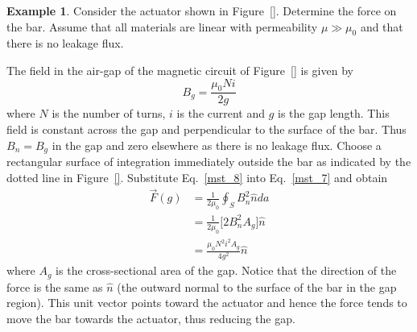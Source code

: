 \documentclass[11pt,a4paper,oneside]{book}
\numberwithin{equation}{section}
\theoremstyle{it}
\theoremstyle{definition}
\newtheorem{example}{Example}[section]
\begin{document}
\begin{example}
Consider the actuator shown in Figure~\ref{}. Determine the force on the bar. Assume that all materials are linear with permeability $\mu\gg\mu_0$ and that there is no leakage flux.

The field in the air-gap of the magnetic circuit of Figure~\ref{} is given by
\begin{equation}\label{mst_8}
	B_g=\frac{\mu_0Ni}{2g}
\end{equation}  
where $N$ is the number of turns, $i$ is the current and $g$ is the gap length. This field is constant across the gap and perpendicular to the surface of the bar. Thus $B_n=B_g$ in the gap and zero elsewhere as there is no leakage flux. Choose a rectangular surface of integration immediately outside the bar as indicated by the dotted line in Figure~\ref{}. Substitute Eq.~\eqref{mst_8} into Eq.~\eqref{mst_7} and obtain
\begin{equation}\label{mst_9}
	\begin{aligned}
	\vec{F}(g) &= \frac{1}{2\mu_0}\oint_{S}B_n^2\hat{n}da \\[6pt]
	&= \frac{1}{2\mu_0}\Big[2B_n^2A_g\Big]\hat{n} \\[6pt]
	&= \frac{\mu_0N^2i^2A_g}{4g^2}\hat{n}
\end{aligned}
\end{equation}  
where $A_g$ is the cross-sectional area of the gap. Notice that the direction of the force is the same as $\hat{n}$ (the outward normal to the surface of the bar in the gap region). This unit vector points toward the actuator and hence the force tends to move the bar towards the actuator, thus reducing the gap.
\end{example}
\end{document}

